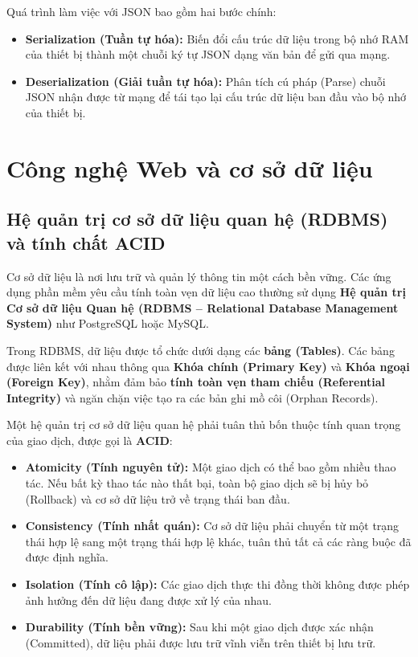 \documentclass[12pt,a4paper]{report}
\begin{document}
Quá trình làm việc với JSON bao gồm hai bước chính:

\begin{itemize}

\item \textbf{Serialization (Tuần tự hóa):} 
Biến đổi cấu trúc dữ liệu trong bộ nhớ RAM của thiết bị thành một chuỗi ký tự JSON dạng văn bản để gửi qua mạng.

\item \textbf{Deserialization (Giải tuần tự hóa):} 
Phân tích cú pháp (Parse) chuỗi JSON nhận được từ mạng để tái tạo lại cấu trúc dữ liệu ban đầu vào bộ nhớ của thiết bị.

\end{itemize}

\section{Công nghệ Web và cơ sở dữ liệu}

\subsection{Hệ quản trị cơ sở dữ liệu quan hệ (RDBMS) và tính chất ACID}

Cơ sở dữ liệu là nơi lưu trữ và quản lý thông tin một cách bền vững. Các ứng dụng phần mềm yêu cầu tính toàn vẹn dữ liệu cao thường sử dụng \textbf{Hệ quản trị Cơ sở dữ liệu Quan hệ (RDBMS -- Relational Database Management System)} như PostgreSQL hoặc MySQL.

Trong RDBMS, dữ liệu được tổ chức dưới dạng các \textbf{bảng (Tables)}. Các bảng được liên kết với nhau thông qua \textbf{Khóa chính (Primary Key)} và \textbf{Khóa ngoại (Foreign Key)}, nhằm đảm bảo \textbf{tính toàn vẹn tham chiếu (Referential Integrity)} và ngăn chặn việc tạo ra các bản ghi mồ côi (Orphan Records).

Một hệ quản trị cơ sở dữ liệu quan hệ phải tuân thủ bốn thuộc tính quan trọng của giao dịch, được gọi là \textbf{ACID}:

\begin{itemize}

\item \textbf{Atomicity (Tính nguyên tử):} 
Một giao dịch có thể bao gồm nhiều thao tác. Nếu bất kỳ thao tác nào thất bại, toàn bộ giao dịch sẽ bị hủy bỏ (Rollback) và cơ sở dữ liệu trở về trạng thái ban đầu.

\item \textbf{Consistency (Tính nhất quán):} 
Cơ sở dữ liệu phải chuyển từ một trạng thái hợp lệ sang một trạng thái hợp lệ khác, tuân thủ tất cả các ràng buộc đã được định nghĩa.

\item \textbf{Isolation (Tính cô lập):} 
Các giao dịch thực thi đồng thời không được phép ảnh hưởng đến dữ liệu đang được xử lý của nhau.

\item \textbf{Durability (Tính bền vững):} 
Sau khi một giao dịch được xác nhận (Committed), dữ liệu phải được lưu trữ vĩnh viễn trên thiết bị lưu trữ.

\end{itemize}
\end{document}
